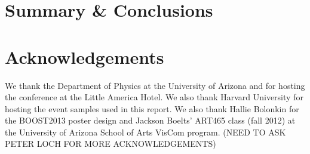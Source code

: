 \documentclass[twocolumn,epjc]{svjour3}
\begin{document}
%

\section{Summary \& Conclusions}
\label{sec:conclusions}

\section*{Acknowledgements}

We thank the Department of Physics at the University of Arizona and for hosting the conference at the Little America Hotel.  We also thank Harvard University for hosting the event samples used in this report.  
We also thank Hallie Bolonkin for the BOOST2013 poster design and Jackson Boelts' ART465 class (fall 2012) at the University of Arizona School of Arts VisCom program. (NEED TO ASK PETER LOCH FOR MORE ACKNOWLEDGEMENTS)


%
%
\end{document}
